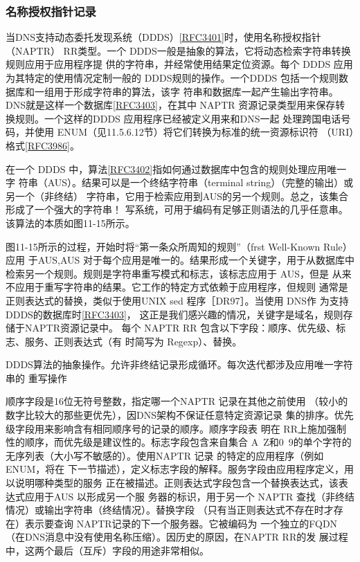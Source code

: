 \subsubsection{名称授权指针记录}

当DNS支持动态委托发现系统（DDDS）\href{https://www.rfc-editor.org/rfc/rfc3401}{[RFC3401]}时，使用名称授权指针（NAPTR）
RR类型。一个 DDDS一般是抽象的算法，它将动态检索字符串转换规则应用于应用程序提
供的字符串，并经常使用结果定位资源。每个 DDDS 应用为其特定的使用情况定制一般的
DDDS规则的操作。一个DDDS 包括一个规则数据库和一组用于形成字符串的算法，该字
符串和数据库一起产生输出字符串。DNS就是这样一个数据库\href{https://www.rfc-editor.org/rfc/rfc3403}{[RFC3403]}，在其中 NAPTR
资源记录类型用来保存转换规则。一个这样的DDDS 应用程序已经被定义用来和DNS一起
处理跨国电话号码，并使用 ENUM（见11.5.6.12节）将它们转换为标准的统一资源标识符
（URI）格式\href{https://www.rfc-editor.org/rfc/rfc3986}{[RFC3986]}。

在一个 DDDS 中，算法\href{https://www.rfc-editor.org/rfc/rfc3402}{[RFC3402]}指如何通过数据库中包含的规则处理应用唯一字
符串（AUS）。结果可以是一个终结字符串（terminal string）（完整的输出）或另一个（非终结）
字符串，它用于检索应用到AUS的另一个规则。总之，该集合形成了一个强大的字符串！
写系统，可用于编码有足够正则语法的几乎任意串。该算法的本质如图11-15所示。

图11-15所示的过程，开始时将“第一条众所周知的规则”（frst Well-Known Rule）应用
于AUS,AUS 对于每个应用是唯一的。结果形成一个关键字，用于从数据库中
检索另一个规则。规则是字符串重写模式和标志，该标志应用于 AUS，但是
从来不应用于重写字符串的结果。它工作的特定方式依赖于应用程序，但规则
通常是正则表达式的替换，类似于使用UNIX sed 程序［DR97］。当使用 DNS作
为支持DDDS的数据库时\href{https://www.rfc-editor.org/rfc/rfc3403}{[RFC3403]}，
这正是我们感兴趣的情况，关键字是域名，规则存储于NAPTR资源记录中。
每个 NAPTR RR 包含以下字段：顺序、优先级、标志、服务、正则表达式（有
时简写为 Regexp）、替换。

DDDS算法的抽象操作。允许非终结记录形成循环。每次迭代都涉及应用唯一字符串的
重写操作

顺序字段是16位无符号整数，指定哪一个NAPTR 记录在其他之前使用
（较小的数字比较大的那些更优先），因DNS架构不保证任意特定资源记录
集的排序。优先级字段用来影响含有相同顺序号的记录的顺序。顺序字段表
明在 RR上施加强制性的顺序，而优先级是建议性的。标志字段包含来自集合
A~Z和0~9的单个字符的无序列表（大小写不敏感的）。使用NAPTR 记录
的特定的应用程序（例如 ENUM，将在
下一节描述），定义标志字段的解释。服务字段由应用程序定义，用以说明哪种类型的服务
正在被描述。正则表达式字段包含一个替换表达式，该表达式应用于AUS 以形成另一个服
务器的标识，用于另一个 NAPTR 查找（非终结情况）或输出字符串（终结情况）。替换字段
（只有当正则表达式不存在时才存在）表示要查询 NAPTR记录的下一个服务器。它被编码为
一个独立的FQDN（在DNS消息中没有使用名称压缩）。因历史的原因，在NAPTR RR的发
展过程中，这两个最后（互斥）字段的用途非常相似。

